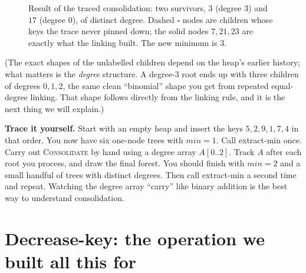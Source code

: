 \begin{figure}[H]
\centering
{}
\caption{Result of the traced consolidation: two survivors, $3$ (degree $3$) and
$17$ (degree $0$), of distinct degree. Dashed $\square$ nodes are children whose
keys the trace never pinned down; the solid nodes $7,21,23$ are exactly what the
linking built. The new minimum is $3$.}
\label{ch20:consol-result}
\end{figure}

(The exact shapes of the unlabelled children depend on the heap's earlier history;
what matters is the \emph{degree} structure. A degree-$3$ root ends up with three
children of degrees $0,1,2$, the same clean ``binomial'' shape you get from
repeated equal-degree linking. That shape follows directly from the linking rule, and it is the next thing
we will explain.)

\begin{labbox}
\textbf{Trace it yourself.} Start with an empty heap and insert the keys
$5,2,9,1,7,4$ in that order. You now have six one-node trees with $\mathit{min}=1$.
Call extract-min once. Carry out \textsc{Consolidate} by hand using a degree array
$A[0..2]$. Track $A$ after each root you process, and draw the final forest. You
should finish with $\mathit{min}=2$ and a small handful of trees with distinct
degrees. Then call extract-min a second time and repeat. Watching the degree array
``carry'' like binary addition is the best way to understand consolidation.
\end{labbox}

\section{Decrease-key: the operation we built all this for}
\label{ch20:decrease-key}

